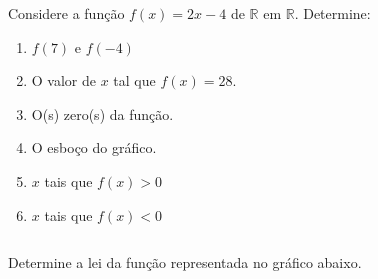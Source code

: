 \begin{frame}
  \begin{columns}[onlytextwidth]
    \begin{column}{0.49\textwidth}
      \begin{example}
        Considere a função $f(x) = 2x - 4$ de $\mathbb{R}$ em $\mathbb{R}$. Determine:
      \end{example}
      \begin{highlight}
        \begin{enumerate}
          \item $f(7)$ e $f(-4)$
          \item O valor de $x$ tal que $f(x) = 28$.
          \item O(s) zero(s) da função.
          \item O esboço do gráfico.
          \item $x$ tais que $f(x) > 0$
          \item $x$ tais que $f(x) < 0$
        \end{enumerate}
      \end{highlight}
    \end{column}

    \begin{column}{0.49\textwidth}
    \end{column}
  \end{columns}
\end{frame}

\begin{frame}
    \begin{columns}[onlytextwidth]
    \begin{column}{0.5\textwidth}
      \begin{example}
        Determine a lei da função representada no gráfico abaixo.
      \end{example}%
      \vspace*{-0.25cm}
      \begin{figure}
      \end{figure}
    \end{column}
    \begin{column}{0.5\textwidth}
    \end{column}
  \end{columns}
\end{frame}